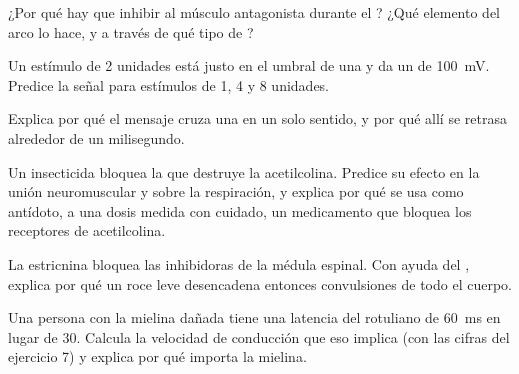 \begin{exercise}[$\star\star$]\label{exo:g12:stretch-reflex:9}
¿Por qué hay que inhibir al músculo antagonista durante el ?
¿Qué elemento del arco lo hace, y a través de qué tipo de ?
\end{exercise}

\begin{exercise}[$\star\star$]\label{exo:g12:stretch-reflex:10}
Un estímulo de 2 unidades está justo en el umbral de una  y da
un  de \qty{100}{mV}. Predice la señal para
estímulos de 1, 4 y 8 unidades.
\end{exercise}

\begin{exercise}[$\star\star$]\label{exo:g12:stretch-reflex:11}
Explica por qué el mensaje cruza una  en un solo sentido, y por
qué allí se retrasa alrededor de un milisegundo.
\end{exercise}

\begin{exercise}[$\star\star\star$]\label{exo:g12:stretch-reflex:12}
Un insecticida bloquea la  que destruye la acetilcolina. Predice
su efecto en la unión neuromuscular y sobre la respiración, y explica
por qué se usa como antídoto, a una dosis medida con cuidado, un
medicamento que bloquea los receptores de acetilcolina.
\end{exercise}

\begin{exercise}[$\star\star\star$]\label{exo:g12:stretch-reflex:13}
La estricnina bloquea las  inhibidoras de la médula espinal.
Con ayuda del , explica por qué un roce leve desencadena
entonces convulsiones de todo el cuerpo.
\end{exercise}

\begin{exercise}[$\star\star\star$]\label{exo:g12:stretch-reflex:14}
Una persona con la mielina dañada tiene una latencia del 
rotuliano de \qty{60}{ms} en lugar de 30. Calcula la velocidad de
conducción que eso implica (con las cifras del ejercicio 7) y explica
por qué importa la mielina.
\end{exercise}

